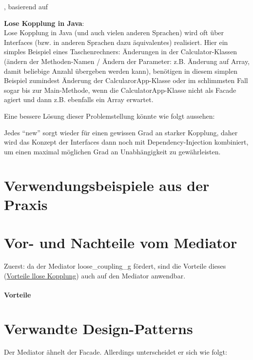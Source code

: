 \medskip
\noindent\autocite[vgl.][]{loosecoupling_reconceptualization}, basierend auf \autocite[vgl.][S. 101ff]{meilir_loosecoupling}
\medskip

\textbf{Lose Kopplung in Java}: \\
Lose Kopplung in Java (und auch vielen anderen Sprachen) wird oft über Interfaces (bzw. in anderen Sprachen dazu äquivalentes) realisiert. Hier ein simples Beispiel eines Taschenrechners:
Änderungen in der Calculator-Klassen (ändern der Methoden-Namen / Ändern der Parameter: z.B. Änderung auf Array, damit beliebige Anzahl übergeben werden kann), benötigen in diesem simplen Beispiel zumindest Änderung der CalcularorApp-Klasse oder im schlimmsten Fall sogar bis zur Main-Methode, wenn die CalculatorApp-Klasse nicht als Facade agiert und dann z.B. ebenfalls ein Array erwartet.

Eine bessere Lösung dieser Problemstellung könnte wie folgt aussehen:

Jedes \enquote{new} sorgt wieder für einen gewissen Grad an starker Kopplung, daher wird das Konzept der Interfaces dann noch mit Dependency-Injection kombiniert, um einen maximal möglichen Grad an Unabhängigkeit zu gewährleisten.
% 
\section{Verwendungsbeispiele aus der Praxis}
% 
\section{Vor- und Nachteile vom Mediator}\label{ref:vorteileNachteile}
Zuerst: da der Mediator \gls{loose_coupling_g} fördert, sind die Vorteile dieses (\hyperref[ref:prosLoseKopplung]{Vorteile llose Kopplung}) auch auf den Mediator anwendbar.

\paragraph{Vorteile}

% 
\section{Verwandte Design-Patterns}
Der Mediator ähnelt der Facade. Allerdings unterscheidet er sich wie folgt:
